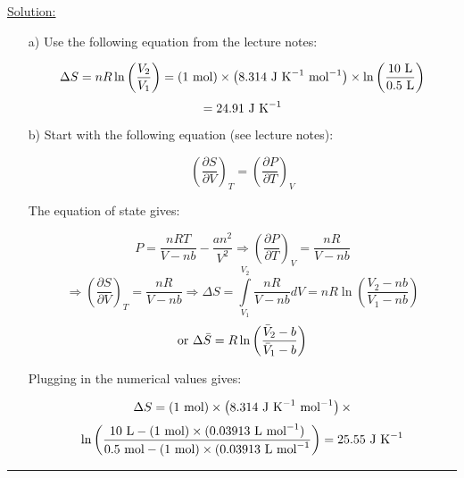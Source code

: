 \noindent
\underline{Solution:}\\

\begin{itemize}

\item[a)] Use the following equation from the lecture notes:

$$\Delta S = nR\ln\left(\frac{V_2}{V_1}\right) = \left(1\textnormal{ mol}\right)\times\left(8.314\textnormal{ J K}^{-1}\textnormal{ mol}^{-1}\right)\times\ln\left(\frac{10\textnormal{ L}}{0.5\textnormal{ L}}\right)$$
$$ = 24.91\textnormal{ J K}^{-1}$$

\item[b)] Start with the following equation (see lecture notes):

$$\left(\frac{\partial S}{\partial V}\right)_T = \left(\frac{\partial P}{\partial T}\right)_V$$

The equation of state gives:

$$P = \frac{nRT}{V - nb} - \frac{an^2}{V^2} \Rightarrow \left(\frac{\partial P}{\partial T}\right)_V = \frac{nR}{V - nb}$$
$$\Rightarrow \left(\frac{\partial S}{\partial V}\right)_T = \frac{nR}{V - nb} \Rightarrow \Delta S = \int\limits_{V_1}^{V_2}\frac{nR}{V -nb}dV = nR\ln\left(\frac{V_2 - nb}{V_1 - nb}\right)$$
$$\textnormal{or }\Delta\bar{S} = R\ln\left(\frac{\bar{V}_2 - b}{\bar{V}_1 - b}\right)$$

Plugging in the numerical values gives:

$$\Delta S = \left(1\textnormal{ mol}\right)\times\left(8.314\textnormal{ J K}^{-1}\textnormal{ mol}^{-1}\right)\times$$
$$\ln\left(\frac{10\textnormal{ L} - (1\textnormal{ mol})\times (0.03913\textnormal{ L mol}^{-1})}{0.5\textnormal{ mol} - (1\textnormal{ mol})\times (0.03913\textnormal{ L mol}^{-1}}\right) = 25.55\textnormal{ J K}^{-1}$$

\end{itemize}

\hrule\vspace{0.5cm}
